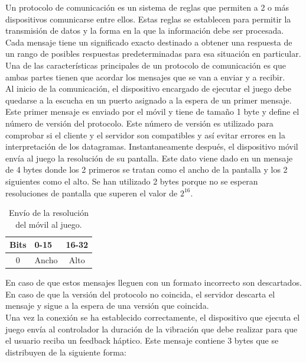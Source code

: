 Un protocolo de comunicaci\'on es un sistema de reglas que permiten a 2 o m\'as dispositivos comunicarse entre ellos. Estas reglas se establecen para permitir la transmisi\'on de datos y la forma en la que la informaci\'on debe ser procesada. Cada mensaje tiene un significado exacto destinado a obtener una respuesta de un rango de posibles respuestas predeterminadas para esa situaci\'on en particular. Una de las caracter\'isticas principales de un protocolo de comunicaci\'on es que ambas partes tienen que acordar los mensajes que se van a enviar y a recibir. \\

Al inicio de la comunicaci\'on, el dispositivo encargado de ejecutar el juego debe quedarse a la escucha en un puerto asignado a la espera de un primer mensaje. Este primer mensaje es enviado por el m\'ovil y tiene de tama\~no 1 byte y define el n\'umero de versi\'on del protocolo. Este n\'umero de versi\'on es utilizado para comprobar si el cliente y el servidor son compatibles y as\'i evitar errores en la interpretaci\'on de los datagramas. Instantaneamente despu\'es, el dispositivo m\'ovil env\'ia al juego la resoluci\'on de su pantalla. Este dato viene dado en un mensaje de 4 bytes donde los 2 primeros se tratan como el ancho de la pantalla y los 2 siguientes como el alto. Se  han utilizado 2 bytes porque no se esperan resoluciones de pantalla que superen el valor de $2^{16}$. \\

\begin{table}[h!]
\centering
\begin{tabular}{|l|l|l|} 
\hline
Bits                    & 0-15                   & 16-32                   \\
\hline
\multicolumn{1}{|c|}{0} & \multicolumn{1}{c|}{Ancho} & \multicolumn{1}{c|}{Alto}  \\
\hline
\end{tabular}
\caption{Env\'io de la resoluci\'on del m\'ovil al juego.}
\label{table:1}
\end{table}

En caso de que estos mensajes lleguen con un formato incorrecto son descartados. En caso de que la versi\'on del protocolo no coincida, el servidor descarta el mensaje y sigue a la espera de una versi\'on que coincida.\\

Una vez la conexi\'on se ha establecido correctamente, el dispositivo que ejecuta el juego env\'ia al controlador la duraci\'on de la vibraci\'on que debe realizar para que el usuario reciba un feedback h\'aptico. Este mensaje contiene 3 bytes que se distribuyen de la siguiente forma:

